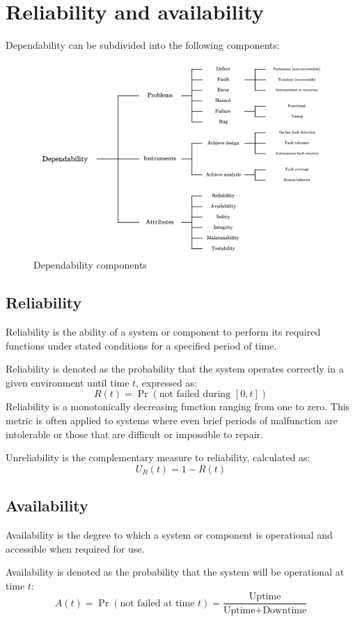 \section{Reliability and availability}

Dependability can be subdivided into the following components:
\begin{figure}[H]
    \centering
    \includegraphics[width=0.6\linewidth]{images/dep1.png}
    \caption{Dependability components}
\end{figure}

\subsection{Reliability}
\begin{definition}
    Reliability is the ability of a system or component to perform its required functions under stated conditions for a specified period of time.
\end{definition}
Reliability is denoted as the probability that the system operates correctly in a given environment until time $t$, expressed as:
\[R(t)=\Pr(\text{not failed during }[0,t])\]
Reliability is a monotonically decreasing function ranging from one to zero. 
This metric is often applied to systems where even brief periods of malfunction are intolerable or those that are difficult or impossible to repair.

Unreliability is the complementary measure to reliability, calculated as:
\[U_R(t)=1-R(t)\]

\subsection{Availability}
\begin{definition}
    Availability is the degree to which a system or component is operational and accessible when required for use.
\end{definition}
Availability is denoted as the probability that the system will be operational at time $t$: 
\[A(t)=\Pr(\text{not failed at time }t)=\dfrac{\text{Uptime}}{\text{Uptime}+\text{Downtime}}\]

